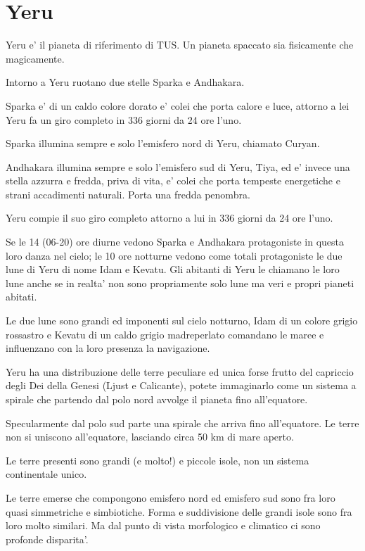 \documentclass[a4paper,11pt,twoside,openany]{dndbook}
\begin{document}
\pagebreak

\section{Yeru}

\label{yeru}

Yeru e' il pianeta di riferimento di TUS. Un pianeta spaccato sia fisicamente che magicamente.

Intorno a Yeru ruotano due stelle Sparka e Andhakara.

Sparka e' di un caldo colore dorato e' colei che porta calore e luce, attorno a lei Yeru fa un giro completo in 336 giorni da 24 ore l'uno. 

Sparka illumina sempre e solo l'emisfero nord di Yeru, chiamato Curyan.

Andhakara illumina sempre e solo l'emisfero sud di Yeru, Tiya, ed e' invece una stella azzurra e fredda, priva di vita, e' colei che porta tempeste energetiche e strani accadimenti naturali. Porta una fredda penombra.

Yeru compie il suo giro completo attorno a lui in 336 giorni da 24 ore l'uno.

Se le 14 (06-20) ore diurne vedono Sparka e Andhakara protagoniste in questa loro danza nel cielo; le 10 ore notturne vedono come totali protagoniste le due lune di Yeru di nome Idam e Kevatu. Gli abitanti di Yeru le chiamano le loro lune anche se in realta' non sono propriamente solo lune ma veri e propri pianeti abitati.

Le due lune sono grandi ed imponenti sul cielo notturno, Idam di un colore grigio rossastro e Kevatu di un caldo grigio madreperlato comandano le maree e influenzano con la loro presenza la navigazione. 

Yeru ha una distribuzione delle terre peculiare ed unica forse frutto del capriccio degli Dei della Genesi (Ljust e Calicante), potete immaginarlo come un sistema a spirale che partendo dal polo nord avvolge il pianeta fino all'equatore. 

Specularmente dal polo sud parte una spirale che arriva fino all'equatore. Le terre non si uniscono all'equatore, lasciando circa 50 km di mare aperto.

Le terre presenti sono grandi (e molto!) e piccole isole, non un sistema continentale unico.

Le terre emerse che compongono emisfero nord ed emisfero sud sono fra loro quasi simmetriche e simbiotiche. Forma e suddivisione delle grandi isole sono fra loro molto similari. Ma dal punto di vista morfologico e climatico ci sono profonde disparita'.
\end{document}
